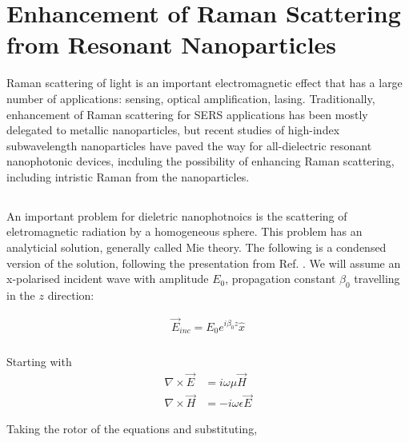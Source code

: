 \section{Enhancement of Raman Scattering from Resonant Nanoparticles}

        Raman scattering of light is an important electromagnetic effect\cite{hayes2012scattering} that has a large number of applications:
    sensing\cite{moskovits1985surface}, optical amplification\cite{islam2004wideband}, lasing\cite{pask2003design}.
    Traditionally, enhancement of Raman scattering for SERS applications has been mostly delegated to metallic nanoparticles, but
    recent studies of high-index subwavelength nanoparticles have paved the way for all-dielectric resonant nanophotonic devices, incduling
    the possibility of enhancing Raman scattering, including intristic Raman from the nanoparticles.

    \subsection{}
            An important problem for dieletric nanophotnoics is the scattering of eletromagnetic radiation by
        a homogeneous sphere. This problem has an analyticial solution, generally called Mie theory\cite{mie1908beitrage}. The following
        is a condensed version of the solution, following the presentation from Ref. \cite{ng2000manipulation}.
        We will assume an x-polarised incident wave with amplitude $E_0$, propagation constant $\beta_0$ travelling in the $z$ direction:

        \begin{align}
            \vec{E}_{inc} = E_0 e^{i\beta_0z}\hat{x}
        \end{align}

        \subsubsection{}
            Starting with
            \begin{align}
                \nabla \times \vec{E} &= i\omega\mu\vec{H} \\
                \nabla \times \vec{H} &= -i\omega\epsilon\vec{E}
            \end{align}

            Taking the rotor of the equations and substituting,

